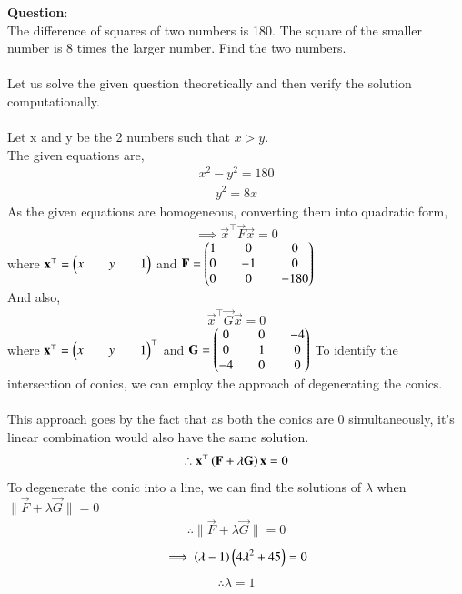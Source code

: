 \documentclass[journal]{IEEEtran}
\begin{document}
\textbf{Question}:\\
The difference of squares of two numbers is 180. The square of the smaller number is 8 times the larger number. Find the two numbers.\\
\solution \\
Let us solve the given question theoretically and then verify the solution computationally.\\
\\
Let x and y be the 2 numbers such that $x>y$.\\
The given equations are,
\begin{align}
    x^2-y^2=180
\end{align}
\begin{align}
    y^2=8x
\end{align}
As the given equations are homogeneous, converting them into quadratic form,
\begin{align}
    \implies \vec{x}^{\top}\vec{F}\vec{x}=0
\end{align}
where $\mathbf{x}^{\top}=\begin{pmatrix}x&&y&&1\end{pmatrix}$ and $\mathbf{F}=\begin{pmatrix}1&&0&&0\\0&&-1&&0\\0&&0&&-180\end{pmatrix}$\\
And also,
\begin{align}
    \vec{x}^{\top}\vec{G}\vec{x}=0
\end{align}
where $\mathbf{x}^{\top}=\begin{pmatrix}x&&y&&1\end{pmatrix}^{\top}$ and $\mathbf{G}=\begin{pmatrix}0&&0&&-4\\0&&1&&0\\-4&&0&&0\end{pmatrix}$
To identify the intersection of conics, we can employ the approach of degenerating the conics.\\
\\
This approach goes by the fact that as both the conics are 0 simultaneously, it's linear combination would also have the same solution.
\begin{align}
    \therefore \mathbf{x}^{\top}\left(\mathbf{F}+\lambda\mathbf{G}\right)\mathbf{x}=0
\end{align}
To degenerate the conic into a line, we can find the solutions of $\lambda$ when $\|\vec{F}+\lambda\vec{G}\|=0$
\begin{align}
    \therefore \|\vec{F}+\lambda\vec{G}\|=0
\end{align}
\begin{align}
    \implies \left(\lambda-1\right)\left(4\lambda^2+45\right)=0
\end{align}
\begin{align}
    \therefore \lambda=1
\end{align}
\end{document}

